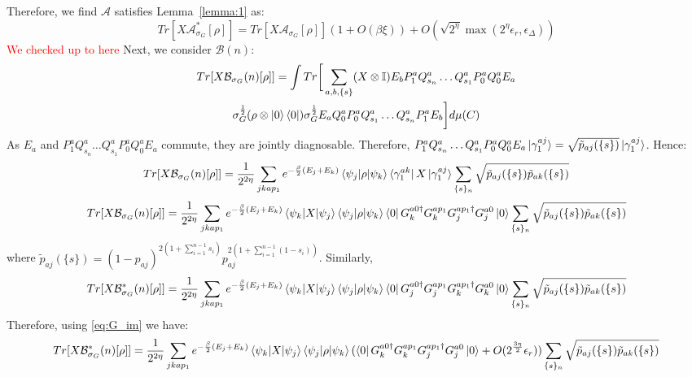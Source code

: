 \documentclass[aps,floatfix,10pt,amssymb,amsfont,amsmath,superscriptaddress,float,nofootinbib,longbibliography,nobalancelastpage,twocolumn]{revtex4-2}
\begin{document}
\begin{widetext}
Therefore, we find $\mathcal{A}$ satisfies Lemma~\ref{lemma:1} as:
\begin{equation}
    Tr\left[X\mathcal{A}^*_{\sigma_G}[\rho]\right] = Tr\left[X\mathcal{A}_{\sigma_G}[\rho]\right](1+O(\beta\xi)) + O(\sqrt{2^{\eta}}\max(2^{\eta}\epsilon_r,\epsilon_\Delta))
\end{equation}
\textcolor{red}{We checked up to here} 
Next, we consider $\mathcal{B}(n)$:
\begin{multline}
    Tr[X\mathcal{B}_{\sigma_G}(n)[\rho]] = \int Tr\bigg[ \sum_{a,b,\{s\}}(X\otimes \mathbb{I})E_bP^a_1Q^a_{s_n}\ldots Q^a_{s_1}P^a_0Q^a_0E_a \\\sigma_G^{\frac{1}{2}}(\rho\otimes \ket{0}\bra{0})\sigma_G^{\frac{1}{2}}  E_aQ^a_0P^a_0Q^a_{s_1}\ldots Q^a_{s_n}P^a_1E_b\bigg]d\mu(C)
\end{multline}
As $E_a$ and $P^a_1Q^a_{s_n}\ldots Q^a_{s_1}P^a_0Q^a_0E_a$ commute, they are jointly diagnosable. Therefore, $P^a_1Q^a_{s_n}\ldots Q^a_{s_1}P^a_0Q^a_0E_a\ket{\gamma_1^{aj}} = \sqrt{\tilde p_{aj}(\{s\})}\ket{\gamma_1^{aj}}$. Hence:
\begin{equation}
    Tr[X\mathcal{B}_{\sigma_G}(n)[\rho]] = \frac{1}{2^{2\eta}}\sum_{jkap_1} e^{-\frac{\beta}{2}(E_j+E_k)}\braket{\psi_j|\rho|\psi_k}\bra{\gamma_1^{ak}}X \ket{\gamma_1^{aj}}\sum_{\{s\}_n}\sqrt{\tilde p_{aj}(\{s\})\tilde p_{ak}(\{s\})}
\end{equation}
\begin{equation}
    Tr[X\mathcal{B}_{\sigma_G}(n)[\rho]] = \frac{1}{2^{2\eta}}\sum_{jkap_1} e^{-\frac{\beta}{2}(E_j+E_k)}\braket{\psi_k|X|\psi_j}\braket{\psi_j|\rho|\psi_k} \bra{0}G^{a0\dagger}_kG^{ap_1}_kG^{ap_1{\dagger}}_jG^{a0}_j\ket{0}\sum_{\{s\}_n}\sqrt{\tilde p_{aj}(\{s\})\tilde p_{ak}(\{s\})}
\end{equation}
where $\tilde p_{aj}(\{s\}) = (1-p_{aj})^{2(1+\sum_{i=1}^{n-1} s_i)}p_{aj}^{2(1+\sum_{i=1}^{n-1} (1-s_i))}$.
Similarly,
\begin{equation}
    Tr[X\mathcal{B}^*_{\sigma_G}(n)[\rho]] = \frac{1}{2^{2\eta}}\sum_{jkap_1} e^{-\frac{\beta}{2}(E_j+E_k)}\braket{\psi_k|X|\psi_j}\braket{\psi_j|\rho|\psi_k} \bra{0}G^{a0\dagger}_jG^{ap_1}_jG^{ap_1{\dagger}}_kG^{a0}_k\ket{0}\sum_{\{s\}_n}\sqrt{\tilde p_{aj}(\{s\})\tilde p_{ak}(\{s\})}
\end{equation}
Therefore, using \eqref{eq:G_im} we have:
\begin{equation}
\label{eq:B*flipped}
    Tr[X\mathcal{B}^*_{\sigma_G}(n)[\rho]] = \frac{1}{2^{2\eta}}\sum_{jkap_1} e^{-\frac{\beta}{2}(E_j+E_k)}\braket{\psi_k|X|\psi_j}\braket{\psi_j|\rho|\psi_k} (\bra{0}G^{a0\dagger}_kG^{ap_1}_kG^{ap_1{\dagger}}_jG^{a0}_j\ket{0}+O(2^{\frac{3\eta}{2}}\epsilon_r))\sum_{\{s\}_n}\sqrt{\tilde p_{aj}(\{s\})\tilde p_{ak}(\{s\})}

\end{equation}
\end{widetext}
\end{document}
